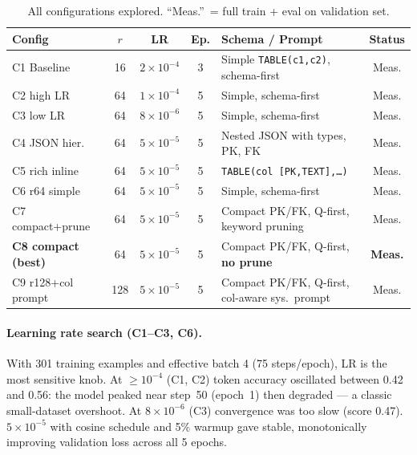 \documentclass[11pt]{article}
\begin{document}
\begin{table}[h]
\centering\footnotesize
\caption{All configurations explored. ``Meas.''\ = full train + eval on validation set.}
\label{tab:configs}
\setlength{\tabcolsep}{3.5pt}
\begin{tabular}{>{\raggedright\arraybackslash}p{2.5cm} c c c >{\raggedright\arraybackslash}p{3.8cm} c}
\toprule
\textbf{Config} & $r$ & \textbf{LR} & \textbf{Ep.} & \textbf{Schema / Prompt} & \textbf{Status} \\
\midrule
C1 Baseline       & 16  & $2\times10^{-4}$ & 3 & Simple \texttt{TABLE(c1,c2)}, schema-first  & Meas. \\
C2 high LR        & 64  & $1\times10^{-4}$ & 5 & Simple, schema-first                         & Meas. \\
C3 low LR         & 64  & $8\times10^{-6}$ & 5 & Simple, schema-first                         & Meas. \\
C4 JSON hier.     & 64  & $5\times10^{-5}$ & 5 & Nested JSON with types, PK, FK               & Meas. \\
C5 rich inline    & 64  & $5\times10^{-5}$ & 5 & \texttt{TABLE(col [PK,TEXT],\ldots)}          & Meas. \\
C6 r64 simple     & 64  & $5\times10^{-5}$ & 5 & Simple, schema-first                         & Meas. \\
C7 compact+prune  & 64  & $5\times10^{-5}$ & 5 & Compact PK/FK, Q-first, keyword pruning      & Meas. \\
\textbf{C8 compact (best)} & 64 & $5\times10^{-5}$ & 5 & Compact PK/FK, Q-first, \textbf{no prune}  & \textbf{Meas.} \\
C9 r128+col prompt & 128 & $5\times10^{-5}$ & 5 & Compact PK/FK, Q-first, col-aware sys.~prompt & Meas. \\
\bottomrule
\end{tabular}
\end{table}

\paragraph{Learning rate search (C1--C3, C6).}
With 301 training examples and effective batch 4 (75 steps/epoch), LR is the most sensitive
knob. At $\ge10^{-4}$ (C1, C2) token accuracy oscillated between 0.42 and 0.56: the model
peaked near step~50 (epoch~1) then degraded — a classic small-dataset overshoot.
At $8\times10^{-6}$ (C3) convergence was too slow (score 0.47).
$5\times10^{-5}$ with cosine schedule and 5\% warmup gave stable, monotonically improving
validation loss across all 5 epochs.
\end{document}
